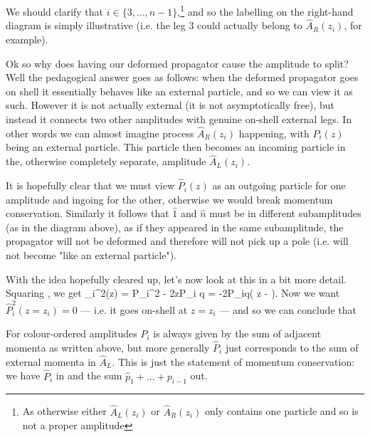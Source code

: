 \br 
    We should clarify that $i\in \{3,...,n-1\}$,\footnote{As otherwise either $\widehat{A}_L(z_i)$ or $\widehat{A}_R(z_i)$ only contains one particle and so is not a proper amplitude} and so the labelling on the right-hand diagram is simply illustrative (i.e. the leg $3$ could actually belong to $\widehat{A}_R(z_i)$, for example). 
\er 

Ok so why does having our deformed propagator cause the amplitude to split? Well the pedagogical answer goes as follows: when the deformed propagator goes on shell it essentially behaves like an external particle, and so we can view it as such. However it is not actually external (it is not asymptotically free), but instead it connects two other amplitudes with genuine on-shell external legs. In other words we can almost imagine process $\widehat{A}_R(z_i)$ happening, with $\widehat{P}_i(z)$ being an external particle. This particle then becomes an incoming particle in the, otherwise completely separate, amplitude $\widehat{A}_L(z_i)$. 

It is hopefully clear that we must view $\widehat{P}_i(z)$ as an outgoing particle for one amplitude and ingoing for the other, otherwise we would break momentum conservation. Similarly it follows that $\widehat{1}$ and $\widehat{n}$ must be in different subamplitudes (as in the diagram above), as if they appeared in the same subamplitude, the propagator will not be deformed and therefore will not pick up a pole (i.e. will not become "like an external particle"). 

With the idea hopefully cleared up, let's now look at this in a bit more detail. Squaring , we get
\bse 
    _i^2(z) = P_i^2 - 2zP_i \cdot q = -2P_i\cdot q\bigg( z -  \bigg).
\ese 
Now we want $\widehat{P}_i^2(z=z_i)=0$ --- i.e. it goes on-shell at $z=z_i$ --- and so we can conclude that

For colour-ordered amplitudes $P_i$ is always given by the sum of adjacent momenta as written above, but more generally $\widehat{P}_i$ just corresponds to the sum of external momenta in $\widehat{A}_L$. This is just the statement of momentum conservation: we have $\widehat{P}_i$ in and the sum $\widehat{p}_1 + ... + p_{i-1}$ out. 

